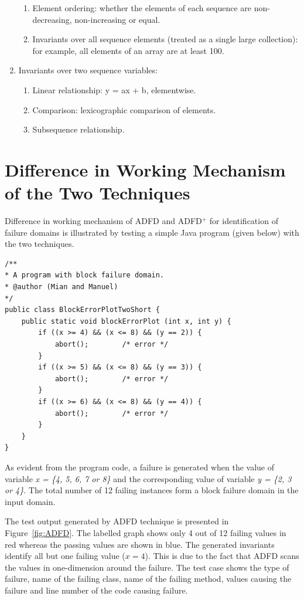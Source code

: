 \begin{enumerate}
\begin{enumerate}
	\item Element ordering: whether the elements of each sequence are non-decreasing, non-increasing or equal.
	\item Invariants over all sequence elements (treated as a single large collection): for example, all elements of an array are at least 100.
	\end{enumerate}
\item Invariants over two sequence variables: 
	\begin{enumerate}
	\item Linear relationship: y = ax + b, elementwise. 
	\item Comparison: lexicographic comparison of elements. 
	\item Subsequence relationship.
	\end{enumerate}
\end{enumerate}








\section{Difference in Working Mechanism of the Two Techniques}
Difference in working mechanism of ADFD and ADFD$^+$ for identification of failure domains is illustrated by testing a simple Java program (given below) with the two techniques. 
\bigskip
\begin{lstlisting}
/** 
* A program with block failure domain.
* @author (Mian and Manuel)
*/
public class BlockErrorPlotTwoShort {
	public static void blockErrorPlot (int x, int y) {
		if ((x >= 4) && (x <= 8) && (y == 2)) { 
			abort();		/* error */
		}
		if ((x >= 5) && (x <= 8) && (y == 3)) { 
			abort();		/* error */
		}
		if ((x >= 6) && (x <= 8) && (y == 4)) { 
			abort();		/* error */
		}
	}
}
\end{lstlisting}
\bigskip


As evident from the program code, a failure is generated when the value of variable \textit{x = \{4, 5, 6, 7 or 8\}} and the corresponding value of variable \textit{y = \{2, 3 or 4\}}. The total number of 12 failing instances form a block failure domain in the input domain.

The test output generated by ADFD technique is presented in Figure~\ref{fig:ADFD}. The labelled graph shows only 4 out of 12 failing values in red whereas the passing values are shown in blue. The generated invariants identify all but one failing value ($x = 4$). This is due to the fact that ADFD scans the values in one-dimension around the failure. The test case shows the type of failure, name of the failing class, name of the failing method, values causing the failure and line number of the code causing failure.

